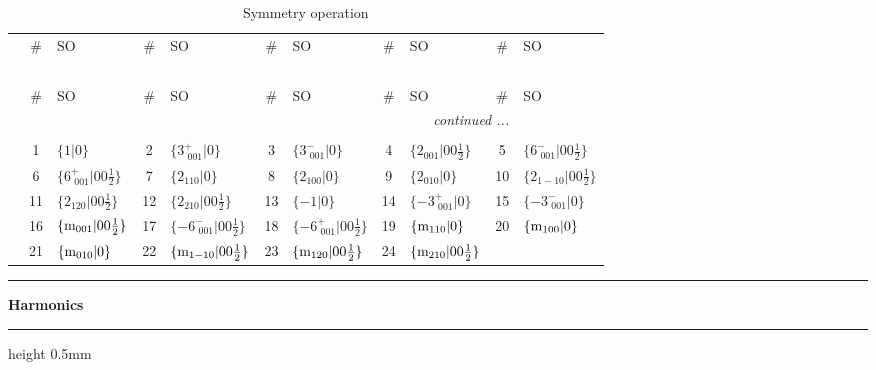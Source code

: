 \documentclass[fleqn,10pt,landscape]{jsarticle}
\begin{document}
\renewcommand{\arraystretch}{1.6}
\begin{longtable}[l]{c|cl|cl|cl|cl|cl}
\captionsetup{justification=raggedright, singlelinecheck=off}
\caption{Symmetry operation}
 \\
 \hline \hline
 & \# & SO & \# & SO & \# & SO & \# & SO & \# & SO \\ \hline \endfirsthead

\multicolumn{10}{l}{\tablename\ \thetable{}} \\
 \hline \hline
 & \# & SO & \# & SO & \# & SO & \# & SO & \# & SO \\ \hline \endhead

 \hline \hline
\multicolumn{10}{r}{\footnotesize\it continued ...} \\ \endfoot

 \hline \hline
\multicolumn{10}{r}{} \\ \endlastfoot

 & 1 & $\{1|0\}$ & 2 & $\{3^{+}_{\,\,001}|0\}$ & 3 & $\{3^{-}_{\,\,001}|0\}$ & 4 & $\{2{}_{001}|0 0 \frac{1}{2}\}$ & 5 & $\{6^{-}_{\,\,001}|0 0 \frac{1}{2}\}$ \\
& 6 & $\{6^{+}_{\,\,001}|0 0 \frac{1}{2}\}$ & 7 & $\{2{}_{110}|0\}$ & 8 & $\{2{}_{100}|0\}$ & 9 & $\{2{}_{010}|0\}$ & 10 & $\{2{}_{1-10}|0 0 \frac{1}{2}\}$ \\
& 11 & $\{2{}_{120}|0 0 \frac{1}{2}\}$ & 12 & $\{2{}_{210}|0 0 \frac{1}{2}\}$ & 13 & $\{-1|0\}$ & 14 & $\{-3^{+}_{\,\,001}|0\}$ & 15 & $\{-3^{-}_{\,\,001}|0\}$ \\
& 16 & $\{{\rm m}_{001}|0 0 \frac{1}{2}\}$ & 17 & $\{-6^{-}_{\,\,001}|0 0 \frac{1}{2}\}$ & 18 & $\{-6^{+}_{\,\,001}|0 0 \frac{1}{2}\}$ & 19 & $\{{\rm m}_{110}|0\}$ & 20 & $\{{\rm m}_{100}|0\}$ \\
& 21 & $\{{\rm m}_{010}|0\}$ & 22 & $\{{\rm m}_{1-10}|0 0 \frac{1}{2}\}$ & 23 & $\{{\rm m}_{120}|0 0 \frac{1}{2}\}$ & 24 & $\{{\rm m}_{210}|0 0 \frac{1}{2}\}$ &  &  \\
\end{longtable}
\vspace{5mm}
\noindent \rule[0.5mm]{5mm}{0.5mm}\hspace{3mm}\textbf{Harmonics}\hspace{3mm}\leaders\hrule height 0.5mm\hfill\kern0pt
\vspace{3mm}
\end{document}
